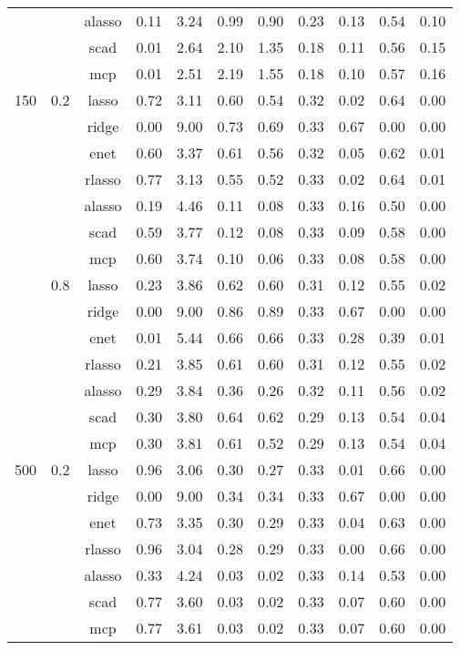 \begin{table}[H]
{\begin{tabular}{c c c|c|c|c c|c c c c}
        & &alasso &0.11 &3.24 &0.99 &0.90 &0.23 &0.13 &0.54 &0.10\\
        & &scad &0.01 &2.64 &2.10 &1.35 &0.18 &0.11 &0.56 &0.15\\
        & &mcp &0.01 &2.51 &2.19 &1.55 &0.18 &0.10&0.57 &0.16\\
        \hline
        150 &0.2 &lasso &0.72 &3.11 &0.60 &0.54 &0.32 &0.02 &0.64 &0.00\\
        & &ridge &0.00 &9.00 &0.73 &0.69 &0.33 &0.67 &0.00&0.00\\
        & &enet &0.60 &3.37 &0.61 &0.56 &0.32 &0.05 &0.62 &0.01\\
        & &rlasso &0.77 &3.13 &0.55 &0.52 &0.33 &0.02 &0.64 &0.01\\
        & &alasso &0.19 &4.46 &0.11 &0.08 &0.33 &0.16 &0.50 &0.00\\
        & &scad &0.59 &3.77 &0.12 &0.08 &0.33 &0.09 &0.58 &0.00\\
        & &mcp &0.60 &3.74 &0.10&0.06 &0.33 &0.08 &0.58 &0.00\\
        \cline{2-11}
        &0.8 &lasso &0.23 &3.86 &0.62 &0.60 &0.31 &0.12 &0.55 &0.02\\
        & &ridge &0.00 &9.00 &0.86 &0.89 &0.33 &0.67 &0.00&0.00\\
        & &enet &0.01 &5.44 &0.66 &0.66 &0.33 &0.28 &0.39 &0.01\\
        & &rlasso &0.21 &3.85 &0.61 &0.60 &0.31 &0.12 &0.55 &0.02\\
        & &alasso &0.29 &3.84 &0.36 &0.26 &0.32 &0.11 &0.56 &0.02\\
        & &scad &0.30&3.80 &0.64 &0.62 &0.29 &0.13 &0.54 &0.04\\
        & &mcp &0.30&3.81 &0.61 &0.52 &0.29 &0.13 &0.54 &0.04\\
        \hline
        500 &0.2 &lasso &0.96 &3.06 &0.30&0.27 &0.33 &0.01 &0.66 &0.00\\
        & &ridge &0.00 &9.00 &0.34 &0.34 &0.33 &0.67 &0.00&0.00\\
        & &enet &0.73 &3.35 &0.30&0.29 &0.33 &0.04 &0.63 &0.00\\
        & &rlasso &0.96 &3.04 &0.28 &0.29 &0.33 &0.00&0.66 &0.00\\
        & &alasso &0.33 &4.24 &0.03 &0.02 &0.33 &0.14 &0.53 &0.00\\
        & &scad &0.77 &3.60 &0.03 &0.02 &0.33 &0.07 &0.60 &0.00\\
        & &mcp &0.77 &3.61 &0.03 &0.02 &0.33 &0.07 &0.60 &0.00\\

\end{tabular}}
\end{table}
